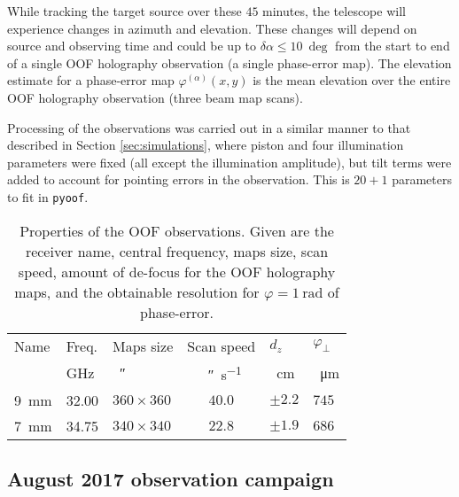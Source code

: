 \documentclass[
    ]
    {aa}
\begin{document}
    While tracking the target source over these $45$ minutes, the telescope will experience changes in azimuth and elevation. These changes will depend on source and observing time and could be up to $\delta\alpha \leq\SI{10}{\deg}$ from the start to end of a single OOF holography observation (a single phase-error map). The elevation estimate for a phase-error map $\varphi^{(\alpha)}(x, y)$ is the mean elevation over the entire OOF holography observation (three beam map scans).

    Processing of the observations was carried out in a similar manner to that described in Section \ref{sec:simulations}, where piston and four illumination parameters were fixed (all except the illumination amplitude), but tilt terms were added to account for pointing errors in the observation. This is $20 + 1$ parameters to fit in \texttt{pyoof}.

    \begin{table}[h]
        \centering
        \caption{Properties of the OOF observations. Given are the receiver name, central frequency, maps size, scan speed, amount of de-focus for the OOF holography maps, and the obtainable resolution for $\varphi = \SI{1}{\radian}$ of phase-error.}
        \label{tab:obs_config}
        \begin{tabular}{lllcll}
            \hline \hline
            Name & Freq. & Maps size & Scan speed & $d_z$ & $\varphi_\bot$ \\
             & GHz & \SI{}{\arcsecond} & \SI{}{\arcsecond\per\second} & \SI{}{\cm} & \SI{}{\micro\metre} \\
            \hline
            \SI{9}{\mm} & 32.00 & $360\times360$ & $40.0$ & $\pm2.2$ & $745$\\
            \SI{7}{\mm} & 34.75 & $340\times340$ & $22.8$ & $\pm1.9$ & $686$\\
            \hline
        \end{tabular}
    \end{table}

    \subsection{August 2017 observation campaign} \label{sec:ObsAug2017}
\end{document}
